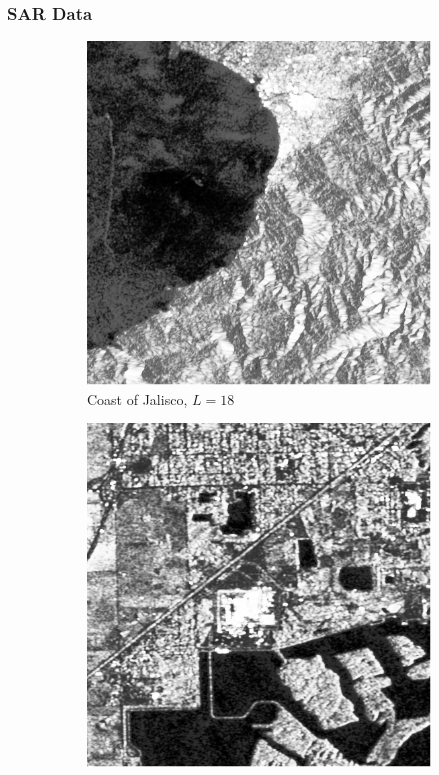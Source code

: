 \documentclass[aspectratio=1610,10pt]{beamer}
\begin{document}
\begin{frame} \frametitle{\large{SAR Data }}\vspace{-0.1cm}

\begin{figure}[H]
  \centering
  \begin{subfigure}[b]{0.3\textwidth}
    \centering
    \includegraphics[width=\textwidth]{../../Figures/PNG/Mexico_512}
    \caption{Coast of Jalisco, $L=18$}
    \label{fig:real_SAR_Images_coe-1}
  \end{subfigure}
  \hfill
  \begin{subfigure}[b]{0.3\textwidth}
    \centering
    \includegraphics[width=\textwidth]{../../Figures/PNG/lake_512}

\end{subfigure}
\end{figure}
\end{frame}
\end{document}
